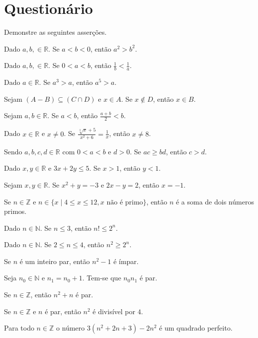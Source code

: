 \section{Questionário}\label{sec:Questionario2part1}

\begin{questao}\label{test:Demosntracoes1}
	Demonstre as seguintes asserções.
\end{questao}

\begin{exerList}
	\item Dado $a, b, \in \mathbb{R}$. Se $a < b < 0$, então $a^2 > b^2$.
	\item Dado $a, b, \in \mathbb{R}$. Se $0 < a < b$, então $\frac{1}{b} < \frac{1}{a}$.
	\item Dado $a \in \mathbb{R}$. Se $a^3 > a$, então $a^5 > a$.
	\item Sejam $(A - B) \subseteq (C \cap D)$ e $x \in A$. Se $x \notin D$, então $x \in B$.
	\item Sejam $a, b \in \mathbb{R}$. Se $a < b$, então $\frac{a + b}{2} < b$.
	\item Dado $x \in \mathbb{R}$ e $x \neq 0$. Se $\frac{\sqrt[3]{x} + 5}{x^2 + 6} = \frac{1}{x}$, então $x \neq 8$.
	\item Sendo $a, b, c, d \in \mathbb{R}$ com $0 < a < b$ e $d > 0$. Se $ac \geq bd$, então $c > d$.
	\item Dado $x, y \in \mathbb{R}$ e $3x + 2y \leq 5$. Se $x > 1$, então $y < 1$.
	\item Sejam $x, y \in \mathbb{R}$. Se $x^2 + y = -3$ e $2x - y = 2$, então $x = -1$.
  \item Se $n \in \mathbb{Z}$ e $n \in \{x \mid 4 \leq x \leq 12, x \text{ não é primo}\}$, então $n$ é a soma de dois números primos.
	\item Dado $n \in \mathbb{N}$. Se $n \leq 3$, então $n! \leq 2^n$.
	\item Dado $n \in \mathbb{N}$. Se $2 \leq n \leq 4$, então $n^2 \geq 2^n$. 
	\item Se $n$ é um inteiro par, então $n^2 - 1$ é ímpar.
	\item Seja $n_0 \in \mathbb{N}$ e $n_1 = n_0 + 1$. Tem-se que $n_0n_1$ é par.
	\item Se $n \in \mathbb{Z}$, então $n^2 + n$ é par.
	\item Se $n \in \mathbb{Z}$ e $n$ é par, então $n^2$ é divisível por $4$. 
	\item Para todo $n \in \mathbb{Z}$ o número $3(n^2 + 2n + 3) - 2n^2$ é um quadrado perfeito.

\end{exerList}
